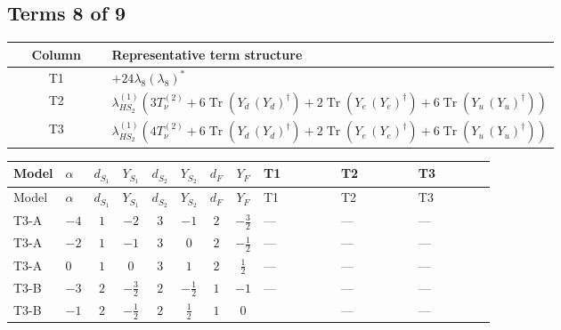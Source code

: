 \documentclass[8pt]{article}
\begin{document}
\begin{landscape}
\subsection*{Terms 8 of 9}
\begin{center}
\begin{tabular}{@{}c >{\raggedright\arraybackslash}p{0.82\linewidth}@{}}
\toprule
Column & Representative term structure \\
\midrule
T1 & \(\displaystyle +24 {\lambda_{8}} \left({\lambda_{8}}\right)^{*}\) \\
\midrule
T2 & \(\displaystyle {\lambda_{HS_2}^{(1)}} (3 T_{\nu}^{(2)}+6 \operatorname{Tr}\!\left({Y_d}\,\left({Y_d}\right)^{\dagger}\right)+2 \operatorname{Tr}\!\left({Y_e}\,\left({Y_e}\right)^{\dagger}\right)+6 \operatorname{Tr}\!\left({Y_u}\,\left({Y_u}\right)^{\dagger}\right))\) \\
\midrule
T3 & \(\displaystyle {\lambda_{HS_2}^{(1)}} (4 T_{\nu}^{(2)}+6 \operatorname{Tr}\!\left({Y_d}\,\left({Y_d}\right)^{\dagger}\right)+2 \operatorname{Tr}\!\left({Y_e}\,\left({Y_e}\right)^{\dagger}\right)+6 \operatorname{Tr}\!\left({Y_u}\,\left({Y_u}\right)^{\dagger}\right))\) \\
\midrule
\bottomrule
\end{tabular}
\end{center}
\smallskip
\tiny
\begin{longtable}{@{}llcccccc >{\raggedright\arraybackslash}p{0.21\linewidth} >{\raggedright\arraybackslash}p{0.21\linewidth} >{\raggedright\arraybackslash}p{0.21\linewidth}@{}}
\toprule
Model & $\alpha$ & $d_{S_1}$ & $Y_{S_1}$ & $d_{S_2}$ & $Y_{S_2}$ & $d_F$ & $Y_F$ & T1 & T2 & T3 \\
\midrule
\endfirsthead
\toprule
Model & $\alpha$ & $d_{S_1}$ & $Y_{S_1}$ & $d_{S_2}$ & $Y_{S_2}$ & $d_F$ & $Y_F$ & T1 & T2 & T3 \\
\midrule
\endhead
T3-A & $-4$ & $1$ & $-2$ & $3$ & $-1$ & $2$ & $-\frac{3}{2}$ & --- & --- & --- \\
\midrule
T3-A & $-2$ & $1$ & $-1$ & $3$ & $0$ & $2$ & $-\frac{1}{2}$ & --- & --- & --- \\
\midrule
T3-A & $0$ & $1$ & $0$ & $3$ & $1$ & $2$ & $\frac{1}{2}$ & --- & --- & --- \\
\midrule
T3-B & $-3$ & $2$ & $-\frac{3}{2}$ & $2$ & $-\frac{1}{2}$ & $1$ & $-1$ & --- & --- & --- \\
\midrule
T3-B & $-1$ & $2$ & $-\frac{1}{2}$ & $2$ & $\frac{1}{2}$ & $1$ & $0$ & \scriptsize\adjustbox{max width=\linewidth}{$\begin{gathered} +24 {\lambda_{8}} \left({\lambda_{8}}\right)^{*}\end{gathered}$} & --- & --- \\

\end{longtable}
\end{landscape}
\end{document}
